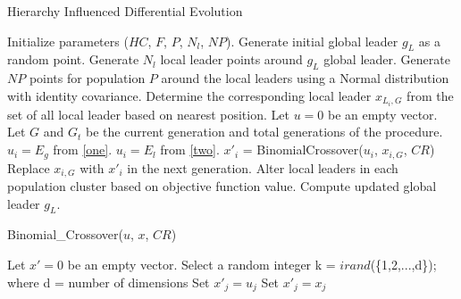 \documentclass[a4paper,twoside]{article}
\begin{document}

\begin{algorithm}[b]
\caption{Hierarchy Influenced Differential Evolution}
\label{algo}
\begin{algorithmic}[1]
    \State Initialize parameters ($HC$, $F$, $P$, $N_l$, $NP$).
    \State Generate initial global leader $g_L$ as a random point.
    \State Generate $N_l$ local leader points around $g_L$ global leader.
    \State Generate $NP$ points for population $P$ around the local leaders using a Normal distribution with identity covariance.
        \State Determine the corresponding local leader $x_{L_i,G}$ from the set of all local leader based on nearest position.
        \State Let $u = 0$ be an empty vector.
        \State Let $G$ and $G_{t}$ be the current generation and total generations of the procedure.
          \State $u_i = E_g$ from \eqref{one}.
        \Else
          \State $u_i = E_l$ from \eqref{two}.
        \EndIf
        \State $x'_{i}$ = BinomialCrossover($u_{i}$, $x_{i,G}$, $CR$)
          \State Replace $x_{i,G}$ with $x'_{i}$ in the next generation.
        \EndIf
      \EndFor
      \State Alter local leaders in each population cluster based on objective function value.
      \State Compute updated global leader $g_L$.
    \EndWhile
  \EndProcedure
\end{algorithmic}
\end{algorithm}

\begin{algorithm}[b]
\caption{Binomial\_Crossover($u$, $x$, $CR$)}
\label{algo}
\begin{algorithmic}[1]
    \State Let $x' = 0$ be an empty vector.
    \State Select a random integer k = $irand$(\{1,2,...,d\}); where d = number of dimensions
        \State Set $x'_{j} = u_{j}$
      \Else
        \State Set $x'_{j} = x_{j}$
      \EndIf
    \EndFor
  \EndProcedure
\end{algorithmic}
\end{algorithm}
\end{document}
